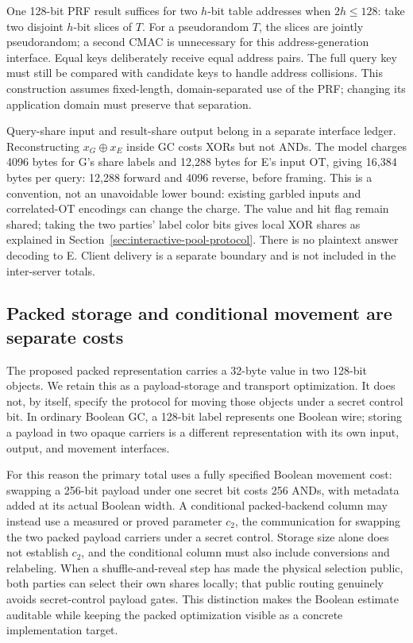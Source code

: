 One 128-bit PRF result suffices for two $h$-bit table addresses when $2h\le128$:
take two disjoint $h$-bit slices of $T$.  For a pseudorandom $T$, the slices are
jointly pseudorandom; a second CMAC is unnecessary for this address-generation
interface.  Equal keys deliberately receive equal address pairs.  The full
query key must still be compared with candidate keys to handle address
collisions.  This construction assumes fixed-length, domain-separated use of
the PRF; changing its application domain must preserve that separation.

Query-share input and result-share output belong in a separate interface ledger.
Reconstructing $x_G\oplus x_E$ inside GC costs XORs but not ANDs.  The model
charges 4096 bytes for G's share labels and 12,288 bytes for E's input OT,
giving 16,384 bytes per query: 12,288 forward and 4096 reverse, before framing.
This is a convention, not an unavoidable lower bound: existing garbled inputs
and correlated-OT encodings can change the charge.  The value and hit flag
remain shared; taking the two parties' label color bits gives local XOR
shares as explained in Section~\ref{sec:interactive-pool-protocol}.
There is no plaintext answer decoding to E.  Client delivery is a separate
boundary and is not included in the inter-server totals.

\subsection{Packed storage and conditional movement are separate costs}
The proposed packed representation carries a 32-byte value in two 128-bit
objects.  We retain this as a payload-storage and transport optimization.
It does not, by itself, specify the protocol for moving those objects under
a secret control bit.  In ordinary Boolean GC, a 128-bit label represents
one Boolean wire; storing a payload in two opaque carriers is a different
representation with its own input, output, and movement interfaces.

For this reason the primary total uses a fully specified Boolean movement
cost: swapping a 256-bit payload under one secret bit costs 256 ANDs, with
metadata added at its actual Boolean width.  A conditional packed-backend
column may instead use a measured or proved parameter $c_2$, the communication
for swapping the two packed payload carriers under a secret control.  Storage
size alone does not establish $c_2$, and the conditional column must also
include conversions and relabeling.  When a shuffle-and-reveal step has made
the physical selection public, both parties can select their own shares
locally; that public routing genuinely avoids secret-control payload gates.
This distinction makes the Boolean estimate auditable while keeping the
packed optimization visible as a concrete implementation target.

